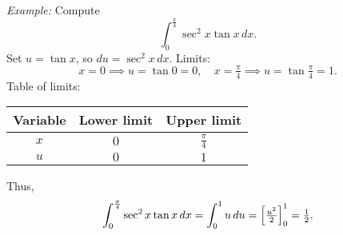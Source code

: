 \documentclass{article}
\begin{document}
\begin{multicols}{2}
\emph{Example:}
Compute
\[
\int_{0}^{\frac{\pi}{4}} \sec^2 x\tan x\,dx.
\]
Set $u=\tan x$, so $du=\sec^2 x\,dx$.  Limits:
\[
x=0\implies u=\tan0=0,
\quad x=\tfrac{\pi}{4}\implies u=\tan\tfrac{\pi}{4}=1.
\]
Table of limits:
\begin{center}
\begin{tabular}{c|cc}
Variable & Lower limit & Upper limit \\
\hline
$x$ & $0$ & $\tfrac{\pi}{4}$ \\
$u$ & $0$ & $1$
\end{tabular}
\end{center}
Thus,
\[
\int_{0}^{\frac{\pi}{4}} \sec^2 x\tan x\,dx
=\int_{0}^{1} u\,du
=\Bigl[\tfrac{u^2}{2}\Bigr]_{0}^{1}
=\tfrac{1}{2}.
\]

\end{multicols}

\newpage
\end{document}
